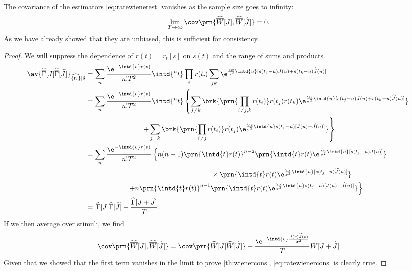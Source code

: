\documentclass[12pt]{article}
\newcommand{\tj}{\widetilde{J}}
\newcommand{\hz}{\widehat{\Gamma}}
\newcommand{\hhz}{\widehat{\overline{\Gamma}}}
\newcommand{\hw}{\widehat{W}}
\newcommand{\hhw}{\widehat{\overline{W}}}
\begin{document}
\begin{thm}
  The covariance of the estimators \eqref{eq:ratewienerest} vanishes as the sample size goes to infinity:
  \begin{equation}\label{eq:ratewienercons}
    \lim_{T\to\infty} \cov\prn{ \hhw[J], \hhw[\tj] } = 0.
  \end{equation}
  As we have already showed that they are unbiased, this is sufficient for consistency.
\end{thm}
\begin{proof}
  We will suppress the dependence of $r(t)=r_t[s]$ on $s(t)$ and the range of sums and products.
  \begin{equation*}
    \begin{aligned}
      \av{\hhz[J]\hhz[\tj]}_{\widehat{\{t_i\}}|\hat{s}} 
        &= \sum_n \frac{\e^{-\intd{v}r(v)}}{n!T^2} \intd{^nt} \prod_i r(t_i) \sum_{jk} 
          \e^{\frac{\ir}{\sigma^2}\intd{u}[s(t_j-u)J(u)+s(t_k-u)\tj(u)]} \\
        &= \sum_n \frac{\e^{-\intd{v}r(v)}}{n!T^2} \intd{^nt} \left\{
          \sum_{j\neq k} \brk{\prn{\prod_{i\neq j,k} r(t_i)} r(t_j) r(t_k) 
          \e^{\frac{\ir}{\sigma^2}\intd{u}[s(t_j-u)J(u)+s(t_k-u)\tj(u)]}} \right. \\
        &\left. \qquad\qquad\qquad\qquad
          + \sum_{j=k} \brk{\prn{\prod_{i\neq j} r(t_i)} r(t_j) 
          \e^{\frac{\ir}{\sigma^2}\intd{u}s(t_j-u)[J(u)+\tj(u)]}}
          \right\} \\
        &= \sum_n \frac{\e^{-\intd{v}r(v)}}{n!T^2} \left\{
          n(n-1) \prn{\intd{t} r(t)}^{n-2} \prn{\intd{t} r(t) 
          \e^{\frac{\ir}{\sigma^2}\intd{u}[s(t_j-u)J(u)]}} \right.\\
        & \qquad\qquad\qquad\qquad\qquad\qquad\qquad\qquad\qquad
          \times \prn{\intd{t} r(t) \e^{\frac{\ir}{\sigma^2}\intd{u}[s(t_j-u)\tj(u)]}} \\
        &\left. \qquad\qquad\qquad
          +  n \prn{\intd{t} r(t)}^{n-1} \prn{\intd{t} r(t) 
          \e^{\frac{\ir}{\sigma^2}\intd{u}s(t_j-u)[J(u)+\tj(u)]}} \right\} \\
        &= \,\hz[J]\hz[\tj] + \frac{\hz[J+\tj]}{T}.
    \end{aligned}
  \end{equation*}
  If we then average over stimuli, we find
  \begin{equation*}
    \cov\prn{\hhw[J],\hhw[\tj]} 
      = \cov\prn{\hw[J]\hw[\tj]} + \frac{\e^{-\intd{v}\frac{J(v)\tj(v)}{\sigma^2}}}{T}W[J+\tj]
  \end{equation*}
  Given that we showed that the first term vanishes in the limit to prove \cref{th:wienercons}, \eqref{eq:ratewienercons} is clearly true.
\end{proof}
\end{document}
